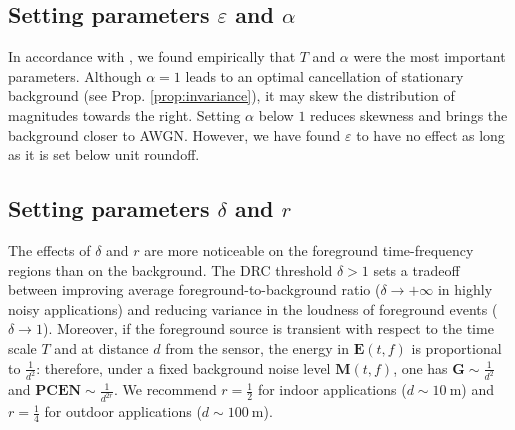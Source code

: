 \documentclass[journal]{IEEEtran}
\makeatletter
\newcommand*{\ie}{i.e.\@\xspace}
\theoremstyle{remark}
\makeatother
\begin{document}

\subsection{Setting parameters $\varepsilon$ and $\alpha$}

In accordance with \cite{wang2017icassp}, we found empirically that $T$ and $\alpha$ were the most important parameters.
Although $\alpha=1$ leads to an optimal cancellation of stationary background (see Prop. \ref{prop:invariance}), it may skew the distribution of magnitudes towards the right.
Setting $\alpha$ below $1$ reduces skewness and brings the background closer to AWGN.
However, we have found $\varepsilon$ to have no effect as long as it is set below unit roundoff.


\subsection{Setting parameters $\delta$ and $r$}

The effects of $\delta$ and $r$ are more noticeable on the foreground time-frequency regions than on the background.
The DRC threshold $\delta>1$ sets a tradeoff between improving average foreground-to-background ratio ($\delta\rightarrow+\infty$ in highly noisy applications) and reducing variance in the loudness of foreground events ($\delta\rightarrow1$).
Moreover, if the foreground source is transient with respect to the time scale $T$ and at distance $d$ from the sensor, the energy in $\mathbf{E}(t,f)$ is proportional to $\frac{1}{d^2}$: therefore, under a fixed background noise level $\mathbf{M}(t,f)$, one has $\mathbf{G}\sim\frac{1}{d^2}$ and $\mathbf{PCEN}\sim\frac{1}{d^{2r}}$.
We recommend $r=\frac{1}{2}$ for indoor applications ($d\sim\SI{10}{\meter}$) and $r=\frac{1}{4}$ for outdoor applications ($d\sim\SI{100}{\meter}$).
\end{document}
